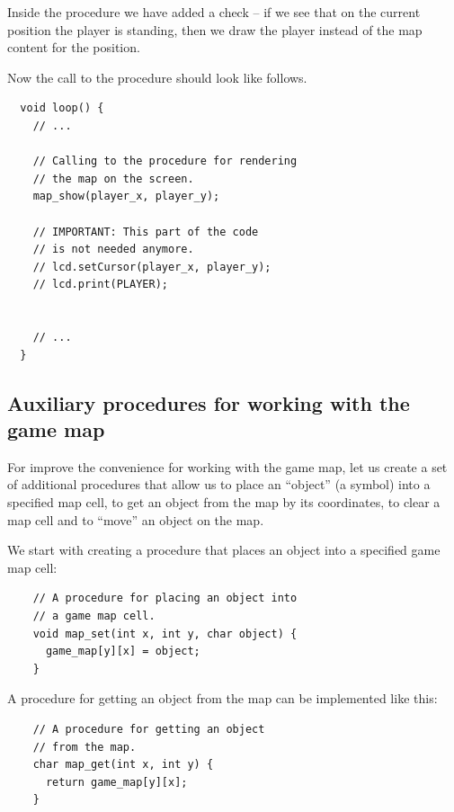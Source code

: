 \documentclass[../sparc.tex]{subfiles}
\begin{document}
Inside the procedure we have added a check -- if we see that on the current
position the player is standing, then we draw the player instead of the map
content for the position.

Now the call to the procedure should look like follows.

\begin{verbatim}
  void loop() {
    // ...

    // Calling to the procedure for rendering
    // the map on the screen.
    map_show(player_x, player_y);

    // IMPORTANT: This part of the code
    // is not needed anymore.
    // lcd.setCursor(player_x, player_y);
    // lcd.print(PLAYER);


    // ...
  }
\end{verbatim}

\subsection{Auxiliary procedures for working with the game map}
\label{game-dev-game-map:extra-procedures}

For improve the convenience for working with the game map, let us create a set
of additional procedures that allow us to place an ``object'' (a symbol) into a
specified map cell, to get an object from the map by its coordinates, to clear a
map cell and to ``move'' an object on the map.

We start with creating a procedure that places an object into a specified game
map cell:

\begin{listing}[H]
  \begin{verbatim}
    // A procedure for placing an object into
    // a game map cell.
    void map_set(int x, int y, char object) {
      game_map[y][x] = object;
    }
  \end{verbatim}
  \caption{Implementation of \texttt{map_set} procedure that allows us
    to place an object on the map.}
  \label{listing:game-dev-map-set-procedure}
\end{listing}

A procedure for getting an object from the map can be implemented like this:

\begin{listing}[H]
  \begin{verbatim}
    // A procedure for getting an object
    // from the map.
    char map_get(int x, int y) {
      return game_map[y][x];
    }
  \end{verbatim}
  \caption{Implementation of \texttt{map_get} procedure for getting an
    object from the map.}
  \label{listing:game-dev-map-get-procedure-00}
\end{listing}
\end{document}

